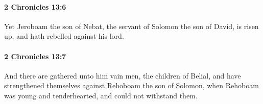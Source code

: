		\paragraph{2 Chronicles 13:6} %
			\label{2CHRONICLES-13-6}

			Yet Jeroboam the son of Nebat, the servant of Solomon the son of David, is risen up, and hath rebelled against his lord.


		\paragraph{2 Chronicles 13:7} %
			\label{2CHRONICLES-13-7}

			And there are gathered unto him vain men, the children of Belial, and have strengthened themselves against Rehoboam the son of Solomon, when Rehoboam was young and tenderhearted, and could not withstand them.


